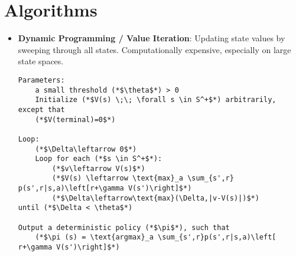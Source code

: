 \documentclass[12pt]{article}
\begin{document}
\section{Algorithms}
\begin{itemize}
	\item\textbf{Dynamic Programming / Value Iteration}: Updating state values by sweeping through all states.
		Computationally expensive, especially on large state spaces.
		\begin{lstlisting}
Parameters:
	a small threshold (*$\theta$*) > 0 
	Initialize (*$V(s) \;\; \forall s \in S^+$*) arbitrarily, except that
	(*$V(terminal)=0$*) 

Loop:
	(*$\Delta\leftarrow 0$*)
	Loop for each (*$s \in S^+$*):
		(*$v\leftarrow V(s)$*)
		(*$V(s) \leftarrow \text{max}_a \sum_{s',r} p(s',r|s,a)\left[r+\gamma V(s')\right]$*)
		(*$\Delta\leftarrow\text{max}(\Delta,|v-V(s)|)$*)
until (*$\Delta < \theta$*)

Output a deterministic policy (*$\pi$*), such that
	(*$\pi (s) = \text{argmax}_a \sum_{s',r}p(s',r|s,a)\left[ r+\gamma V(s')\right]$*)
		\end{lstlisting}
\end{itemize}
\end{document}
